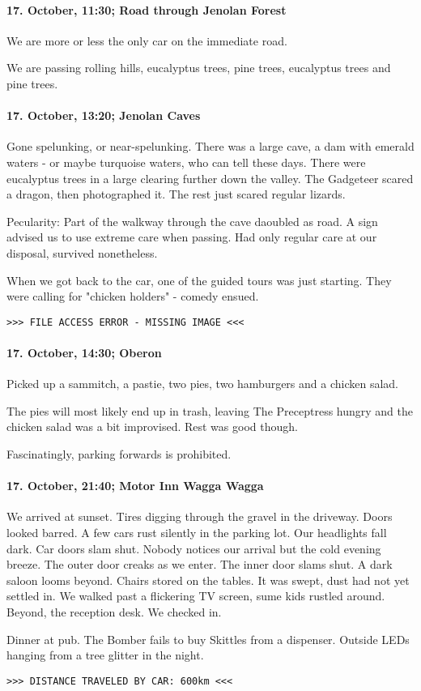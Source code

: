 \paragraph{17. October, 11:30; Road through Jenolan Forest}
We are more or less the only car on the immediate road.

We are passing rolling hills, eucalyptus trees, pine trees, eucalyptus trees and pine trees.

\paragraph{17. October, 13:20; Jenolan Caves}
Gone spelunking, or near-spelunking.
There was a large cave, a dam with emerald waters - or maybe turquoise waters, who can tell these days.
There were eucalyptus trees in a large clearing further down the valley.
The Gadgeteer scared a dragon, then photographed it.
The rest just scared regular lizards.

Pecularity: Part of the walkway through the cave daoubled as road.
A sign advised us to use extreme care when passing.
Had only regular care at our disposal, survived nonetheless.

When we got back to the car, one of the guided tours was just starting.
They were calling for "chicken holders" - comedy ensued.

\texttt{>>> FILE ACCESS ERROR - MISSING IMAGE <<<}

\paragraph{17. October, 14:30; Oberon}
Picked up a sammitch, a pastie, two pies, two hamburgers and a chicken salad.

The pies will most likely end up in trash, leaving The Preceptress hungry and the chicken salad was a bit improvised.
Rest was good though.

Fascinatingly, parking forwards is prohibited.

\paragraph{17. October, 21:40; Motor Inn Wagga Wagga}
We arrived at sunset.
Tires digging through the gravel in the driveway.
Doors looked barred.
A few cars rust silently in the parking lot.
Our headlights fall dark.
Car doors slam shut.
Nobody notices our arrival but the cold evening breeze.
The outer door creaks as we enter.
The inner door slams shut.
A dark saloon looms beyond.
Chairs stored on the tables.
It was swept, dust had not yet settled in.
We walked past a flickering TV screen, sume kids rustled around.
Beyond, the reception desk.
We checked in.

Dinner at pub.
The Bomber fails to buy Skittles from a dispenser.
Outside LEDs hanging from a tree glitter in the night.

\texttt{>>> DISTANCE TRAVELED BY CAR: 600km <<<}
